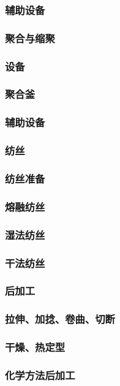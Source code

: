 \documentclass[UTF8]{../../ApplicationUniverse}
\begin{document}
                \subsubsection{辅助设备}
        \subsubsection{聚合与缩聚}
            \subsubsection{设备}
                \subsubsection{聚合釜}
                \subsubsection{辅助设备}
        \subsubsection{纺丝}
            \subsubsection{纺丝准备}
            \subsubsection{熔融纺丝}
            \subsubsection{湿法纺丝}
            \subsubsection{干法纺丝}
        \subsubsection{后加工}
            \subsubsection{拉伸、加捻、卷曲、切断}
            \subsubsection{干燥、热定型}
            \subsubsection{化学方法后加工}
\end{document}
